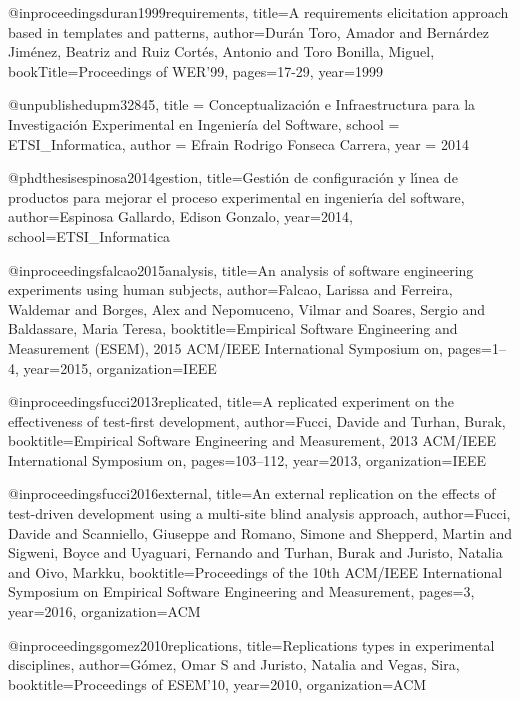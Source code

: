 @inproceedings{duran1999requirements,
  title={A requirements elicitation approach based in templates and patterns},
  author={Dur{\'a}n Toro, Amador and Bern{\'a}rdez Jim{\'e}nez, Beatriz and Ruiz Cort{\'e}s, Antonio and Toro Bonilla, Miguel},
  bookTitle={Proceedings of WER'99},
  pages={17-29},
  year={1999}
}

@unpublished{upm32845,
           title = {Conceptualizaci{\'o}n e Infraestructura para la Investigaci{\'o}n Experimental en Ingenier{\'i}a del Software},
          school = {ETSI\_Informatica},
          author = {Efrain Rodrigo Fonseca Carrera},
            year = {2014}
}

@phdthesis{espinosa2014gestion,
  title={Gesti{\'o}n de configuraci{\'o}n y l{\'\i}nea de productos para mejorar el proceso experimental en ingenier{\'\i}a del software},
  author={Espinosa Gallardo, Edison Gonzalo},
  year={2014},
  school={ETSI\_Informatica}
}

@inproceedings{falcao2015analysis,
  title={An analysis of software engineering experiments using human subjects},
  author={Falcao, Larissa and Ferreira, Waldemar and Borges, Alex and Nepomuceno, Vilmar and Soares, Sergio and Baldassare, Maria Teresa},
  booktitle={Empirical Software Engineering and Measurement (ESEM), 2015 ACM/IEEE International Symposium on},
  pages={1--4},
  year={2015},
  organization={IEEE}
}

@inproceedings{fucci2013replicated,
  title={A replicated experiment on the effectiveness of test-first development},
  author={Fucci, Davide and Turhan, Burak},
  booktitle={Empirical Software Engineering and Measurement, 2013 ACM/IEEE International Symposium on},
  pages={103--112},
  year={2013},
  organization={IEEE}
}

@inproceedings{fucci2016external,
  title={An external replication on the effects of test-driven development using a multi-site blind analysis approach},
  author={Fucci, Davide and Scanniello, Giuseppe and Romano, Simone and Shepperd, Martin and Sigweni, Boyce and Uyaguari, Fernando and Turhan, Burak and Juristo, Natalia and Oivo, Markku},
  booktitle={Proceedings of the 10th ACM/IEEE International Symposium on Empirical Software Engineering and Measurement},
  pages={3},
  year={2016},
  organization={ACM}
}

@inproceedings{gomez2010replications,
  title={Replications types in experimental disciplines},
  author={G{\'o}mez, Omar S and Juristo, Natalia and Vegas, Sira},
  booktitle={Proceedings of ESEM'10},
  year={2010},
  organization={ACM}
}

